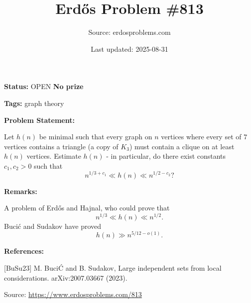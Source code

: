 \documentclass{article}
\title{Erd\H{o}s Problem \#813}
\date{Last updated: 2025-08-31}
\author{Source: erdosproblems.com}
\begin{document}
\maketitle

\noindent\textbf{Status:} OPEN \quad \textbf{No prize}

\noindent\textbf{Tags:} graph theory

\medskip
\noindent\textbf{Problem Statement:}

Let $h(n)$ be minimal such that every graph on $n$ vertices where every set of $7$ vertices contains a triangle (a copy of $K_3$) must contain a clique on at least $h(n)$ vertices. Estimate $h(n)$ - in particular, do there exist constants $c_1,c_2>0$ such that\[n^{1/3+c_1}\ll h(n) \ll n^{1/2-c_2}?\]

\bigskip
\noindent\textbf{Remarks:}

A problem of Erd\H{o}s and Hajnal, who could prove that\[n^{1/3}\ll h(n) \ll n^{1/2}.\]Buci\'{c} and Sudakov \cite{BuSu23} have proved\[h(n) \gg n^{5/12-o(1)}.\]

\bigskip
\noindent\textbf{References:}

[BuSu23] M. Buci\'C and B. Sudakov, Large independent sets from local considerations. arXiv:2007.03667 (2023).

\bigskip
\noindent\small{Source: \url{https://www.erdosproblems.com/813}}
\end{document}
